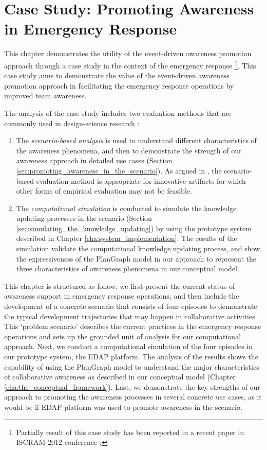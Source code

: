\graphicspath{{Figures/}}

\chapter{Case Study: Promoting Awareness in Emergency Response} %
\label{cha:case_studies}
This chapter demonstrates the utility of the event-driven awareness promotion approach through a case study in the context of the emergency response \footnote{Partially result of this case study has been reported in a recent paper in ISCRAM 2012 conference \cite{Yu2012}.}. This case study aims to demonstrate the value of the event-driven awareness promotion approach in facilitating the emergency response operations by improved team awareness. 

The analysis of the case study includes two evaluation methods that are commonly used in design-science research \cite{Hevner2004}:
\begin{enumerate}
	\item The \emph{scenario-based analysis} is used to understand different characteristics of the awareness phenomena, and then to demonstrate the strength of our awareness approach in detailed use cases (Section \ref{sec:promoting_awareness_in_the_scenario}). As argued in \cite{Hevner2004}, the scenario-based evaluation method is appropriate for innovative artifacts for which other forms of empirical evaluation may not be feasible. 
	\item The \emph{computational simulation} is conducted to simulate the knowledge updating processes in the scenario (Section \ref{sec:simulating_the_knowledge_updating}) by using the prototype system described in Chapter \ref{cha:system_implementation}. The results of the simulation validate the computational knowledge updating process, and show the expressiveness of the PlanGraph model in our approach to represent the three characteristics of awareness phenomena in our conceptual model.
\end{enumerate}

This chapter is structured as follow: we first present the current status of awareness support in emergency response operations, and then include the development of a concrete scenario that consists of four episodes to demonstrate the typical development trajectories that may happen in collaborative activities. This `problem scenario' \cite{rosson2001usability} describes the current practices in the emergency response operations and sets up the grounded unit of analysis for our computational approach. Next, we conduct a computational simulation of the four episodes in our prototype system, the EDAP platform. The analysis of the results shows the capability of using the PlanGraph model to understand the major characteristics of collaborative awareness as described in our conceptual model (Chapter \ref{cha:the_conceptual_framework}). Last, we demonstrate the key strengths of our approach to promoting the awareness processes in several concrete use cases, as it would be if EDAP platform was used to promote awareness in the scenario.

